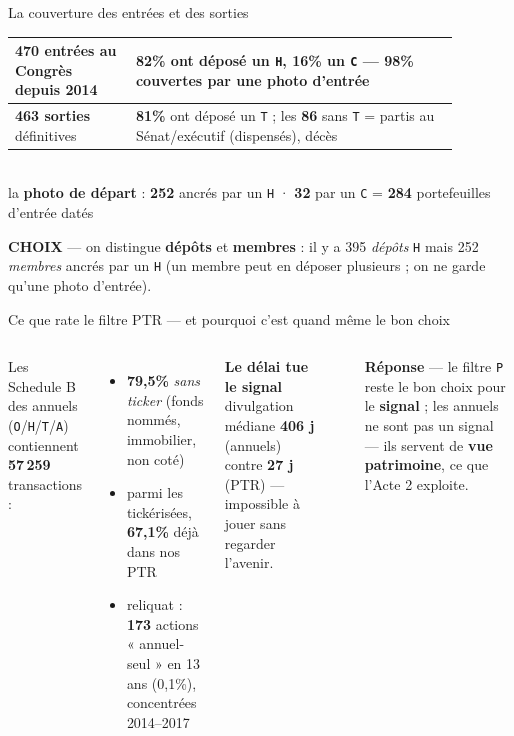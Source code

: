 \documentclass[11pt,aspectratio=169]{beamer}
\newcommand{\co}[1]{\texttt{#1}}
\newcommand{\choixbox}[1]{%
  \colorbox{alertred!8}{\parbox{\dimexpr\linewidth-8pt}{\scriptsize
    \textbf{\textcolor{alertred}{CHOIX}}\; --- #1}}}
\newcommand{\repband}[1]{%
  \colorbox{okgreen!12}{\parbox{\dimexpr\linewidth-10pt}{\scriptsize
    \textbf{\textcolor{okgreen}{Réponse}}\; --- #1}}}
\begin{document}
\begin{frame}{La couverture des entrées et des sorties}
  \centering\vspace{2mm}
  {\footnotesize
  \begin{tabular}{@{}p{0.24\linewidth} p{0.64\linewidth}@{}}
   \toprule
   \textbf{470 entrées} au Congrès depuis 2014 & \textbf{82\%} ont déposé un \co{H}, \textbf{16\%} un \co{C} --- \textbf{98\% couvertes} par une photo d'entrée\\
   \midrule
   \textbf{463 sorties} définitives & \textbf{81\%} ont déposé un \co{T} ; les \textbf{86} sans \co{T} = partis au Sénat/exécutif (dispensés), décès\\
   \bottomrule
  \end{tabular}}\\[3mm]
  {\footnotesize la \textbf{photo de départ} : \textbf{252} ancrés par un \co{H} · \textbf{32} par un \co{C} = \textbf{284} portefeuilles d'entrée datés}\\[3mm]
  \choixbox{on distingue \textbf{dépôts} et \textbf{membres} : il y a 395 \emph{dépôts} \co{H} mais 252 \emph{membres} ancrés par un \co{H} (un membre peut en déposer plusieurs ; on ne garde qu'une photo d'entrée).}
\end{frame}

\begin{frame}{Ce que rate le filtre PTR --- et pourquoi c'est quand même le bon choix}
  \begin{columns}[T]
   {\footnotesize Les Schedule B des annuels (\co{O}/\co{H}/\co{T}/\co{A}) contiennent \textbf{57\,259} transactions :}
   \begin{itemize}\footnotesize
    \item[--] \textbf{79,5\%} \emph{sans ticker} (fonds nommés, immobilier, non coté)
    \item[--] parmi les tickérisées, \textbf{67,1\%} déjà dans nos PTR
    \item[--] reliquat : \textbf{173} actions « annuel-seul » en 13 ans (0,1\%), concentrées 2014--2017
   \end{itemize}
   \colorbox{alertred!8}{\parbox[t]{\dimexpr\linewidth-8pt}{\vspace{0.6mm}\footnotesize
     \textbf{\textcolor{alertred}{Le délai tue le signal}}\\[0.6mm]
     divulgation médiane \textbf{406 j} (annuels) contre \textbf{27 j} (PTR) --- impossible à jouer sans regarder l'avenir.}}\\[3mm]
   \repband{le filtre \co{P} reste le bon choix pour le \textbf{signal} ; les annuels ne sont pas un signal --- ils servent de \textbf{vue patrimoine}, ce que l'Acte 2 exploite.}
  \end{columns}
\end{frame}
\end{document}
